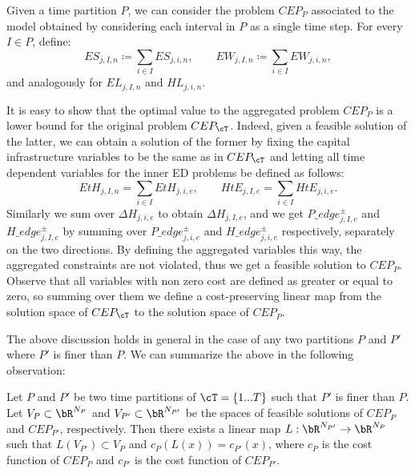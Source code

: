 Given a time partition $P$, we can consider the problem \(CEP_P\) associated to the model obtained by considering each interval in \(P\) as a single time step. 
For every \(I\in P\), define:
\begin{equation}\label{sums scenarios}
ES_{j,I,n} \coloneqq \sum_{i \in I} ES_{j,i,n}, \quad\quad EW_{j,I,n} \coloneqq \sum_{i \in I} EW_{j,i,n}, 
\end{equation}
and analogously for $EL_{j,I,n}$ and $HL_{j,i,n}$.

It is easy to show that the optimal value to the aggregated problem \(CEP_P\) is a lower bound for the original problem \(CEP_{\cT}\). 
Indeed, given a feasible solution of the latter, we can obtain a solution of the former by fixing the capital infrastructure variables to be the same as in \(CEP_{\cT}\) and letting all time dependent variables for the inner ED problems be defined as follows:
\begin{equation}\label{sums var_t}
EtH_{j,I,n} = \sum_{i \in I} EtH_{j,i,e}, \quad\quad HtE_{j,I,e} = \sum_{i \in I} HtE_{j,i,e}.
\end{equation}
Similarly we sum over \(\Delta H_{j,i,e}\) to obtain \(\Delta H_{j,I,e}\), and we get \(P\_edge^\pm_{j,I,e}\) and \(H\_edge^\pm_{j,I,e}\) by summing over \(P\_edge^\pm_{j,i,e}\) and \(H\_edge^\pm_{j,i,e}\) respectively, separately on the two directions.
By defining the aggregated variables this way, the aggregated constraints are not violated, thus we get a feasible solution to \(CEP_P\).
Observe that all variables with non zero cost are defined as greater or equal to zero, so summing over them we define a cost-preserving linear map from the solution space of \(CEP_{\cT}\) to the solution space of \(CEP_P\).

The above discussion holds in general in the case of any two partitions $P$ and $P'$ where $P'$ is finer than $P$.
We can summarize the above in the following observation:
\begin{observation}
Let $P$ and $P'$ be two time partitions of $\cT=\{1...T\}$ such that $P'$ is finer than $P$. Let \(V_{P} \subset \bR^{N_{P}}\) and \(V_{P'} \subset \bR^{N_{P'}}\) be the spaces of feasible solutions of \(CEP_{P}\) and \(CEP_{P'}\), respectively. Then there exists a linear map \(L: \bR^{N_{P'}} \to \bR^{N_{P}}\) such that \(L(V_{P'}) \subset V_{P}\) and \(c_{P}(L(x)) = c_{P'}(x)\), where \(c_{P}\) is the cost function of \(CEP_{P}\) and \(c_{P'}\) is the cost function of \(CEP_{P'}\).
\end{observation}


